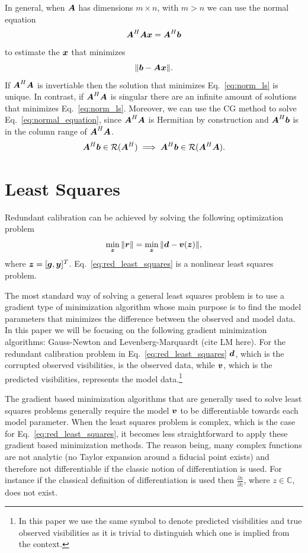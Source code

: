 \documentclass[useAMS,usenatbib]{mn2e}
\newcommand{\bz}{\bmath{z}}
\newcommand{\bA}{\bmath{A}}
\newcommand{\br}{\bmath{r}}
\newcommand{\bg}{\bmath{g}}
\newcommand{\bd}{\bmath{d}}
\newcommand{\bv}{\bmath{v}}
\newcommand{\by}{\bmath{y}}
\newcommand{\bb}{\bmath{b}}
\newcommand{\bx}{\bmath{x}}
\newcommand{\conj}[1]{\overline{#1}}
\begin{document}
In general, when $\bA$ has dimensions $m\times n$, with $m > n$ we can use the normal equation 
\begin{equation}
\label{eq:normal_equation}
\bA^H\bA\bx = \bA^H\bb 
\end{equation}
to estimate the $\bx$ that minimizes
\begin{equation}
\label{eq:norm_ls}
\|\bb-\bA\bx\|. 
\end{equation}
If $\bA^H\bA$ is invertiable then the solution that minimizes Eq.~\eqref{eq:norm_ls} is unique. In contrast, if $\bA^H\bA$ is singular there are an infinite amount of solutions
that minimizes Eq.~\eqref{eq:norm_ls}. Moreover, we can use the CG method to solve Eq.~\eqref{eq:normal_equation}, since $\bA^H\bA$ is Hermitian by construction 
and $\bA^H\bb$ is in the column range of $\bA^H\bA$.
\begin{equation}
\bA^H\bb \in \mathcal{R}(\bA^H) \implies \bA^H\bb \in \mathcal{R}(\bA^H\bA).   
\end{equation}



\section{Least Squares}
Redundant calibration can be achieved by solving the following optimization problem
\begin{equation}
\label{eq:red_least_squares}
\min_{\bz} \|\br\| = \min_{\bz} \|\bd - \bv(\bz)\|, 
\end{equation}
where $\bz = [\bg,\by]^T$. Eq.~\eqref{eq:red_least_squares} is a nonlinear least squares problem.

The most standard way of solving a general least squares problem is to use a gradient type of minimization algorithm whose main purpose is to find the model parameters that 
minimizes the difference between the observed and model data. In this paper we will be focusing on the following gradient minimization algorithms: Gauss-Newton and Levenberg-Marquardt (cite LM here). For the redundant calibration problem in Eq.~\eqref{eq:red_least_squares} $\bd$, which is the corrupted observed visibilities, is the observed data,
while $\bv$, which is the predicted visibilities, represents the model data.\footnote{In this paper we use the same symbol to denote predicted visibilities and true observed visibilities as it
is trivial to distinguish which one is implied from the context.}   

The gradient based minimization algorithms that are generally used to solve least squares problems generally require the model $\bv$ to be differentiable
towards each model parameter. When the least squares problem is complex, which is the case for Eq.~\eqref{eq:red_least_squares}, it becomes less straightforward to apply these gradient based minimization methods. The reason being,
many complex functions are not analytic (no Taylor expansion around a fiducial point exists) and therefore not differentiable if the classic notion of differentiation is used. For instance if the 
classical definition of differentiation is used then $\frac{\partial z}{\partial \conj{z}}$, where $z \in \mathbb{C}$, does not exist.
\end{document}
